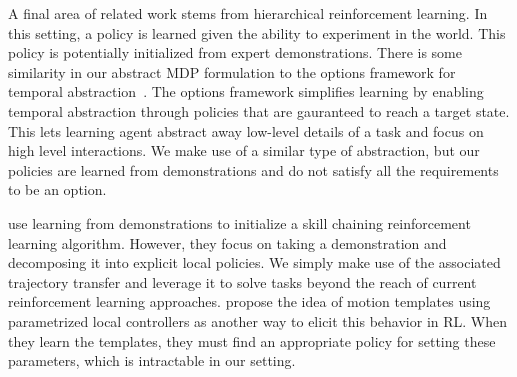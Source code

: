 A final area of related work stems from hierarchical reinforcement learning. 
In this setting, a policy is learned given the ability to experiment in the world.
This policy is potentially initialized from expert demonstrations.
There is some similarity in our abstract MDP formulation to the options 
framework for temporal abstraction~\cite{sutton1999between}.
The options framework simplifies learning by enabling temporal abstraction through
policies that are gauranteed to reach a target state. 
This lets learning agent abstract away low-level details of a task and focus on 
high level interactions. 
We make use of a similar type of abstraction, but our policies are learned from 
demonstrations and do not satisfy all the requirements to be an option.

\citet{konidaris2010constructing} use learning from demonstrations to initialize a skill chaining reinforcement learning algorithm.
However, they focus on taking a demonstration and decomposing it into explicit local policies.
We simply make use of the associated trajectory transfer and leverage it to solve tasks beyond the reach of current reinforcement learning approaches.
\citet{Neumann09learningcomplex} propose the idea of motion templates using parametrized local controllers as another way to elicit this behavior in RL.
When they learn the templates, they must find an appropriate policy for setting these parameters, which is intractable in our setting.
